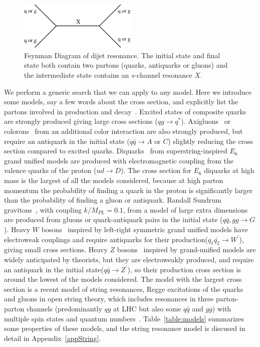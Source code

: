 \begin{figure}[hbt]
  \begin{center}
      \includegraphics[width=0.5\textwidth]{Figures/resonanceDiagram.pdf}
    \caption{ Feynman Diagram of dijet resonance. The initial state
and final state both contain two partons (quarks, antiquarks or
gluons) and the intermediate state contains an $s$-channel resonance
$X$.}
    \label{feyn}
  \end{center}
\end{figure}


We perform a generic search that we can apply to any model.
Here we introduce some models, say a few words about the cross section, 
and explicitly list the partons involved in production and decay~\cite{CMS_AN_2006-070}. 
Excited states of 
composite quarks~\cite{Baur:1987ga} are strongly produced giving large cross sections 
($qg\rightarrow q^*$). Axigluons~\cite{Bagger:1987fz} 
or colorons~\cite{Chivukula:1996yr} 
from an additional color interaction are also strongly produced, but require an 
antiquark in the initial state ($q\bar{q} \rightarrow A$ or $C$) 
slightly reducing the cross section compared to excited quarks.  
Diquarks~\cite{Hewett:1988xc} from 
superstring-inspired $E_6$ grand unified models are produced with
electromagnetic coupling from the valence quarks of the proton 
($ud \rightarrow D$). 
The cross section for $E_6$ diquarks at high mass is the largest 
of all the models considered, because at high parton momentum the 
probability of finding a quark 
in the proton is significantly larger than the probability of finding a 
gluon or antiquark. 
Randall Sundrum gravitons~\cite{RS}, with coupling $k/M_{PL}=0.1$, from a model of 
large extra dimensions are produced 
from gluons or quark-antiquark pairs in the initial state ($q\bar{q},gg \rightarrow G$).
Heavy $W$ bosons~\cite{Eichten:1984eu} inspired by left-right
symmetric grand unified models have electroweak couplings 
and require antiquarks for their
production($q_1 \bar{q_2} \rightarrow W^{\prime}$), giving small cross sections.  
Heavy $Z$ bosons~\cite{Eichten:1984eu} 
inspired by grand-unified models are widely anticipated by theorists, 
but they are electroweakly produced, 
and require an antiquark in the initial state($q\bar{q} \rightarrow Z^{\prime}$), 
so their production cross section is around the lowest of the models considered.
The model with the largest cross section is a recent model of string resonances, 
Regge excitations of the quarks and gluons in open string theory, which
includes resonances in three parton-parton channels (predominantly $qg$ at LHC but also some $q\bar{q}$ and $gg$)
with multiple spin states and quantum numbers~\cite{Anchordoqui:2008di,Cullen:2000ef}.
Table~\ref{table:models} summarizes some properties of these models, and the string resonance model
is discused in detail in Appendix~\ref{appString}.


